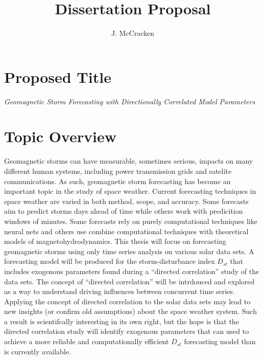 \documentclass[letter,11pt]{article}
\title{Dissertation Proposal}
\author{J. McCracken}
\begin{document}

\noindent\makebox[\linewidth]{\rule{\paperwidth}{0.4pt}}

\section*{Proposed Title}
{\em Geomagnetic Storm Forecasting with Directionally Correlated Model Parameters}

\section*{Topic Overview}
Geomagnetic storms can have measurable, sometimes serious, impacts on many different human systems, including power transmission grids and satelite communications.  As such, geomagnetic storm forecasting has become an important topic in the study of space weather.  Current forecasting techniques in space weather are varied in both method, scope, and accuracy.  Some forecasts aim to predict storms days ahead of time while others work with predicition windows of minutes.  Some forecasts rely on purely computational techniques like neural nets and others use combine computational techniques with theoretical models of magnetohydrodynamics.  This thesis will focus on forecasting geomagnetic storms using only time series analysis on various solar data sets.  A forecasting model will be produced for the storm-disturbance index $D_{st}$ that includes exogenous parameters found during a ``directed correlation'' study of the data sets.  The concept of ``directed correlation'' will be intrdouced and explored as a way to understand driving influences between concurrent time series.  Applying the concept of directed correlation to the solar data sets may lead to new insights (or confirm old assumptions) about the space weather system.  Such a result is scientifcally interesting in its own right, but the hope is that the directed correlation study will identify exogenous parameters that can used to achieve a more reliable and computationally efficient $D_{st}$ forecasting model than is currently available.
\end{document}

